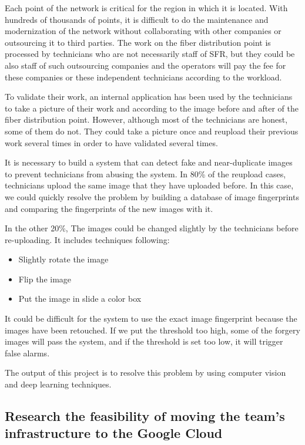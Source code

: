 Each point of the network is critical for the region in which it is located. With hundreds of thousands of points, it is difficult to do the maintenance and modernization of the network without collaborating with other companies or outsourcing it to third parties. The work on the fiber distribution point is processed by technicians who are not necessarily staff of SFR, but they could be also staff of such outsourcing companies and the operators will pay the fee for these companies or these independent technicians according to the workload.

To validate their work, an internal application has been used by the technicians to take a picture of their work and according to the image before and after of the fiber distribution point. However, although most of the technicians are honest, some of them do not. They could take a picture once and reupload their previous work several times in order to have validated several times.

It is necessary to build a system that can detect fake and near-duplicate images to prevent technicians from abusing the system. In 80\% of the reupload cases, technicians upload the same image that they have uploaded before. In this case, we could quickly resolve the problem by building a database of image fingerprints and comparing the fingerprints of the new images with it.

In the other 20\%, The images could be changed slightly by the technicians before re-uploading. It includes techniques following:

\begin{itemize}
    \item Slightly rotate the image
    \item Flip the image
    \item Put the image in slide a color box
\end{itemize}

It could be difficult for the system to use the exact image fingerprint because the images have been retouched. If we put the threshold too high, some of the forgery images will pass the system, and if the threshold is set too low, it will trigger false alarms.

The output of this project is to resolve this problem by using computer vision and deep learning techniques.

\subsection{Research the feasibility of moving the team's infrastructure to the Google Cloud}


